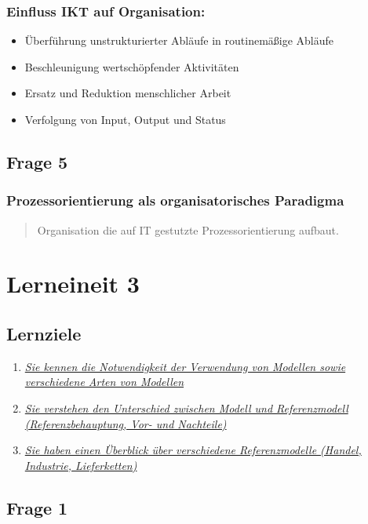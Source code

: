 \documentclass[a4paper]{article}
\begin{document}
			\subsubsection{Einfluss IKT auf Organisation:}
			\begin{itemize}
				\item Überführung unstrukturierter Abläufe in routinemäßige Abläufe
				\item Beschleunigung wertschöpfender Aktivitäten
				\item Ersatz und Reduktion menschlicher Arbeit
				\item Verfolgung von Input, Output und Status
			\end{itemize}
			
			
			\subsection{Frage 5}
			\label{le2-5}
			\subsubsection{Prozessorientierung als organisatorisches Paradigma}
			\begin{quote}
				Organisation die auf IT gestutzte Prozessorientierung aufbaut.
			\end{quote}
			
			\pagebreak %
			
			\section{Lerneineit 3}
			\subsection{Lernziele}
			\begin{enumerate}
				\item \hyperref[le3-1]{\textit{Sie kennen die Notwendigkeit der Verwendung von Modellen sowie verschiedene Arten von Modellen}}
				\item \hyperref[le3-2]{\textit{Sie verstehen den Unterschied zwischen Modell und Referenzmodell (Referenzbehauptung, Vor- und Nachteile)}}
				\item \hyperref[le3-3]{\textit{Sie haben einen Überblick über verschiedene Referenzmodelle (Handel, Industrie, Lieferketten)}}
			\end{enumerate}
			
			\subsection{Frage 1}
			\label{le3-1}
			\label{redir5-1--3-1}
\end{document}
